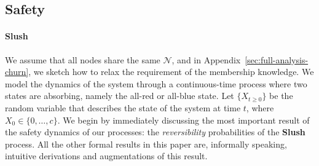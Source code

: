 \documentclass[letterpaper,twocolumn,10pt]{article}
\theoremstyle{definition}
\begin{document}



\subsection{Safety}

\paragraph{Slush} 
We assume that
all nodes share the same $\mathcal{N}$, and in
Appendix~\ref{sec:full-analysis-churn}, we sketch how to relax the requirement of the membership knowledge.
We model the dynamics of the system through a continuous-time process where two states are absorbing, namely the all-red or all-blue state. Let $\{X_{t \geq 0}\}$ be the random variable that describes the state of the system at time $t$, where $X_0 \in \{0, \dots, c\}$.
We begin by immediately discussing the most important result of the safety dynamics of our processes: the \emph{reversibility} probabilities of the \textbf{Slush} process. All the other formal results in this paper are, informally speaking, intuitive derivations and augmentations of this result. 
\end{document}
